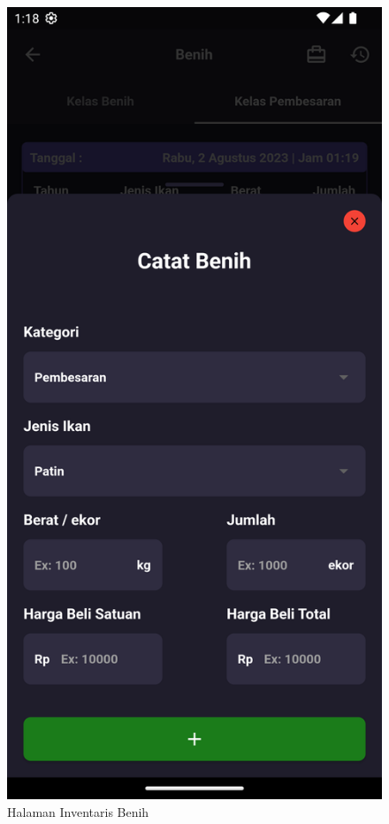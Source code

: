 \begin{spacing}{1.5}
\begin{enumerate}
\begin{figure}[H]
				\caption{Halaman Inventaris Benih}
			\endminipage\hfill
				\includegraphics[width=\linewidth]{gambar/sprint3/benih_2.png}

\end{figure}
\end{enumerate}
\end{spacing}
